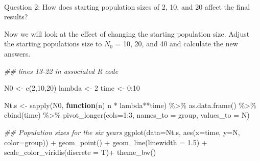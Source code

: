 \documentclass[
]{article}
\makeatletter
\let\oldparagraph\paragraph
\renewcommand{\paragraph}{
    \@ifstar
      \xxxParagraphStar
      \xxxParagraphNoStar
  }
\newcommand{\xxxParagraphStar}[1]{\oldparagraph*{#1}\mbox{}}
\newcommand{\xxxParagraphNoStar}[1]{\oldparagraph{#1}\mbox{}}
\newenvironment{Shaded}{\begin{snugshade}}{\end{snugshade}}
\newcommand{\AttributeTok}[1]{\textcolor[rgb]{0.40,0.45,0.13}{#1}}
\newcommand{\ControlFlowTok}[1]{\textcolor[rgb]{0.00,0.23,0.31}{\textbf{#1}}}
\newcommand{\DecValTok}[1]{\textcolor[rgb]{0.68,0.00,0.00}{#1}}
\newcommand{\DocumentationTok}[1]{\textcolor[rgb]{0.37,0.37,0.37}{\textit{#1}}}
\newcommand{\FloatTok}[1]{\textcolor[rgb]{0.68,0.00,0.00}{#1}}
\newcommand{\FunctionTok}[1]{\textcolor[rgb]{0.28,0.35,0.67}{#1}}
\newcommand{\NormalTok}[1]{\textcolor[rgb]{0.00,0.23,0.31}{#1}}
\newcommand{\OtherTok}[1]{\textcolor[rgb]{0.00,0.23,0.31}{#1}}
\newcommand{\SpecialCharTok}[1]{\textcolor[rgb]{0.37,0.37,0.37}{#1}}
\newcommand{\StringTok}[1]{\textcolor[rgb]{0.13,0.47,0.30}{#1}}
\makeatother
\begin{document}
\paragraph{Question 2: How does starting population sizes of 2, 10, and
20 affect the final
results?}\label{question-2-how-does-starting-population-sizes-of-2-10-and-20-affect-the-final-results}

Now we will look at the effect of changing the starting population size.
Adjust the starting populations size to \(N_0\) = 10, 20, and 40 and
calculate the new answers.

\begin{Shaded}
\begin{Highlighting}[]
\DocumentationTok{\#\# lines 13{-}22 in associated R code}

\NormalTok{N0 }\OtherTok{\textless{}{-}} \FunctionTok{c}\NormalTok{(}\DecValTok{2}\NormalTok{,}\DecValTok{10}\NormalTok{,}\DecValTok{20}\NormalTok{) }
\NormalTok{lambda }\OtherTok{\textless{}{-}} \DecValTok{2}
\NormalTok{time }\OtherTok{\textless{}{-}} \DecValTok{0}\SpecialCharTok{:}\DecValTok{10}

\NormalTok{Nt.s }\OtherTok{\textless{}{-}} \FunctionTok{sapply}\NormalTok{(N0, }\ControlFlowTok{function}\NormalTok{(n) n }\SpecialCharTok{*}\NormalTok{ lambda}\SpecialCharTok{**}\NormalTok{time) }\SpecialCharTok{\%\textgreater{}\%} \FunctionTok{as.data.frame}\NormalTok{() }\SpecialCharTok{\%\textgreater{}\%} \FunctionTok{cbind}\NormalTok{(time) }\SpecialCharTok{\%\textgreater{}\%} \FunctionTok{pivot\_longer}\NormalTok{(}\AttributeTok{cols=}\DecValTok{1}\SpecialCharTok{:}\DecValTok{3}\NormalTok{, }\AttributeTok{names\_to =} \StringTok{\textquotesingle{}group\textquotesingle{}}\NormalTok{, }\AttributeTok{values\_to =} \StringTok{\textquotesingle{}N\textquotesingle{}}\NormalTok{)}

\DocumentationTok{\#\# Population sizes for the six years}
\FunctionTok{ggplot}\NormalTok{(}\AttributeTok{data=}\NormalTok{Nt.s, }\FunctionTok{aes}\NormalTok{(}\AttributeTok{x=}\NormalTok{time, }\AttributeTok{y=}\NormalTok{N, }\AttributeTok{color=}\NormalTok{group)) }\SpecialCharTok{+} 
  \FunctionTok{geom\_point}\NormalTok{() }\SpecialCharTok{+} 
  \FunctionTok{geom\_line}\NormalTok{(}\AttributeTok{linewidth =} \FloatTok{1.5}\NormalTok{) }\SpecialCharTok{+} 
  \FunctionTok{scale\_color\_viridis}\NormalTok{(}\AttributeTok{discrete =}\NormalTok{ T)}\SpecialCharTok{+}
  \FunctionTok{theme\_bw}\NormalTok{()}
\end{Highlighting}
\end{Shaded}
\end{document}
